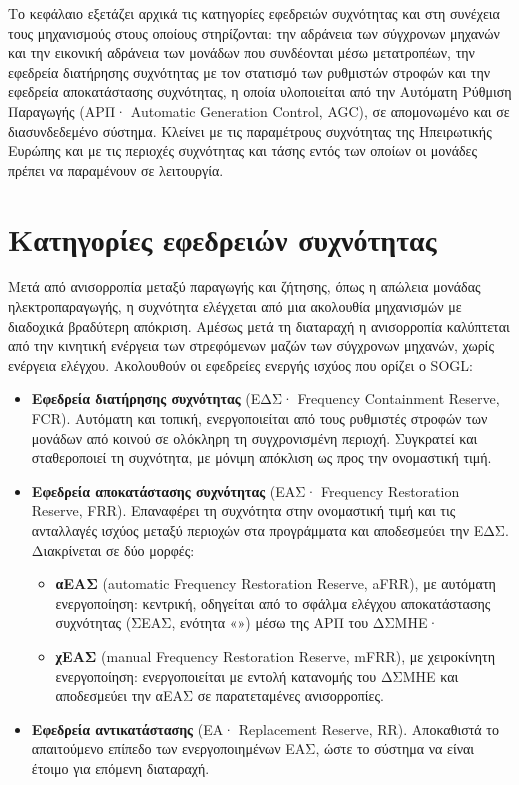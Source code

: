 Το κεφάλαιο εξετάζει αρχικά τις κατηγορίες εφεδρειών συχνότητας και στη συνέχεια τους
μηχανισμούς στους οποίους στηρίζονται: την αδράνεια των σύγχρονων μηχανών και την εικονική
αδράνεια των μονάδων που συνδέονται μέσω μετατροπέων, την εφεδρεία διατήρησης συχνότητας με
τον στατισμό των ρυθμιστών στροφών και την εφεδρεία αποκατάστασης συχνότητας, η οποία
υλοποιείται από την Αυτόματη Ρύθμιση Παραγωγής (ΑΡΠ· Automatic Generation Control, AGC), σε
απομονωμένο και σε διασυνδεδεμένο σύστημα. Κλείνει με τις παραμέτρους συχνότητας της
Ηπειρωτικής Ευρώπης και με τις περιοχές συχνότητας και τάσης εντός των οποίων οι μονάδες
πρέπει να παραμένουν σε λειτουργία.

\section{Κατηγορίες εφεδρειών συχνότητας}
\label{sec:reserves}

Μετά από ανισορροπία μεταξύ παραγωγής και ζήτησης, όπως η απώλεια μονάδας ηλεκτροπαραγωγής, η
συχνότητα ελέγχεται από μια ακολουθία μηχανισμών με διαδοχικά βραδύτερη απόκριση. Αμέσως μετά
τη διαταραχή η ανισορροπία καλύπτεται από την κινητική ενέργεια των στρεφόμενων μαζών των
σύγχρονων μηχανών, χωρίς ενέργεια ελέγχου. Ακολουθούν οι εφεδρείες ενεργής ισχύος που ορίζει ο
SOGL:

\begin{itemize}
\item \textbf{Εφεδρεία διατήρησης συχνότητας} (ΕΔΣ· Frequency Containment Reserve, FCR).
      Αυτόματη και τοπική, ενεργοποιείται από τους ρυθμιστές στροφών των μονάδων από κοινού σε
      ολόκληρη τη συγχρονισμένη περιοχή. Συγκρατεί και σταθεροποιεί τη συχνότητα, με μόνιμη
      απόκλιση ως προς την ονομαστική τιμή.
\item \textbf{Εφεδρεία αποκατάστασης συχνότητας} (ΕΑΣ· Frequency Restoration Reserve, FRR).
      Επαναφέρει τη συχνότητα στην ονομαστική τιμή και τις ανταλλαγές ισχύος μεταξύ περιοχών
      στα προγράμματα και αποδεσμεύει την ΕΔΣ. Διακρίνεται σε δύο μορφές:
      \begin{itemize}
      \item \textbf{αΕΑΣ} (automatic Frequency Restoration Reserve, aFRR), με αυτόματη ενεργοποίηση: κεντρική, οδηγείται από το σφάλμα
            ελέγχου αποκατάστασης συχνότητας (ΣΕΑΣ, ενότητα «») μέσω της ΑΡΠ του
            ΔΣΜΗΕ·
      \item \textbf{χΕΑΣ} (manual Frequency Restoration Reserve, mFRR), με χειροκίνητη ενεργοποίηση: ενεργοποιείται με εντολή
            κατανομής του ΔΣΜΗΕ και αποδεσμεύει την αΕΑΣ σε παρατεταμένες ανισορροπίες.
      \end{itemize}
\item \textbf{Εφεδρεία αντικατάστασης} (ΕΑ· Replacement Reserve, RR). Αποκαθιστά το απαιτούμενο
      επίπεδο των ενεργοποιημένων ΕΑΣ, ώστε το σύστημα να είναι έτοιμο για επόμενη διαταραχή.
\end{itemize}

